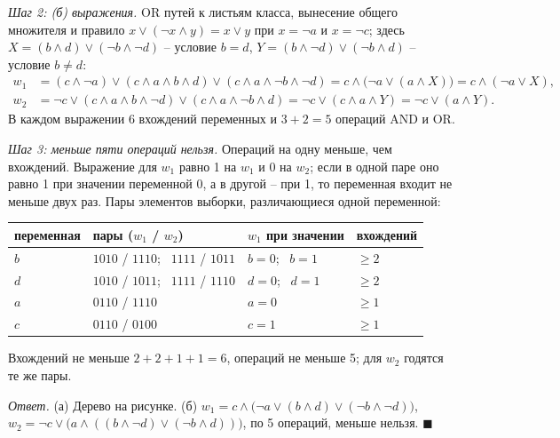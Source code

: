 \documentclass[12pt,a4paper]{article}
\begin{document}
\emph{Шаг 2: (б) выражения.} OR путей к листьям класса, вынесение общего множителя и
правило $x \vee (\neg x \wedge y) = x \vee y$ при $x = \neg a$ и $x = \neg c$; здесь
$X = (b \wedge d) \vee (\neg b \wedge \neg d)$ -- условие $b = d$,
$Y = (b \wedge \neg d) \vee (\neg b \wedge d)$ -- условие $b \ne d$:
\[
\begin{aligned}
  w_1 &= (c \wedge \neg a) \vee (c \wedge a \wedge b \wedge d)
         \vee (c \wedge a \wedge \neg b \wedge \neg d)
       = c \wedge \bigl(\neg a \vee (a \wedge X)\bigr)
       = c \wedge (\neg a \vee X),\\
  w_2 &= \neg c \vee (c \wedge a \wedge b \wedge \neg d) \vee (c \wedge a \wedge \neg b \wedge d)
       = \neg c \vee (c \wedge a \wedge Y)
       = \neg c \vee (a \wedge Y).
\end{aligned}
\]
В каждом выражении 6 вхождений переменных и $3 + 2 = 5$ операций AND и OR.

\emph{Шаг 3: меньше пяти операций нельзя.} Операций на одну меньше, чем вхождений.
Выражение для $w_1$ равно 1 на $w_1$ и 0 на $w_2$; если в одной паре оно равно 1 при
значении переменной 0, а в другой -- при 1, то переменная входит не меньше двух раз.
Пары элементов выборки, различающиеся одной переменной:
\begin{center}
\begin{tabular}{llll}
\toprule
переменная & пары ($w_1$ / $w_2$) & $w_1$ при значении & вхождений \\
\midrule
$b$ & $1010$ / $1110$; \ $1111$ / $1011$ & $b = 0$; \ $b = 1$ & $\ge 2$ \\
$d$ & $1010$ / $1011$; \ $1111$ / $1110$ & $d = 0$; \ $d = 1$ & $\ge 2$ \\
$a$ & $0110$ / $1110$ & $a = 0$ & $\ge 1$ \\
$c$ & $0110$ / $0100$ & $c = 1$ & $\ge 1$ \\
\bottomrule
\end{tabular}
\end{center}
Вхождений не меньше $2 + 2 + 1 + 1 = 6$, операций не меньше 5; для $w_2$ годятся те
же пары.

\emph{Ответ.} (а) Дерево на рисунке. (б)
$w_1 = c \wedge \bigl(\neg a \vee (b \wedge d) \vee (\neg b \wedge \neg d)\bigr)$,
$w_2 = \neg c \vee \bigl(a \wedge ((b \wedge \neg d) \vee (\neg b \wedge d))\bigr)$,
по 5 операций, меньше нельзя. $\blacksquare$
\end{document}
